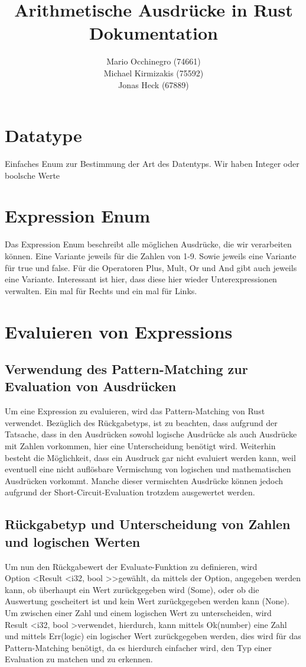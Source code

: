 \documentclass[a4paper, 1ppt]{article}
\title{Arithmetische Ausdrücke in Rust Dokumentation}
\date{}
\author{
		Mario Occhinegro (74661)\\
		Michael Kirmizakis (75592)\\
		Jonas Heck (67889)
}
\begin{document}
\nocite{*}
\maketitle
\newpage
\clearpage
\tableofcontents
\setcounter{page}{1}
\newpage
{}
\maketitle
\section{Datatype}
Einfaches Enum zur Bestimmung der Art des Datentyps.
Wir haben Integer oder boolsche Werte
\section{Expression Enum}
Das Expression Enum beschreibt alle möglichen Ausdrücke, die wir verarbeiten können.
Eine Variante jeweils für die Zahlen von 1-9. Sowie jeweils eine Variante für true und false.
Für die Operatoren Plus, Mult, Or und And gibt auch jeweils eine Variante. Interessant ist hier, dass 
diese hier wieder Unterexpressionen verwalten. Ein mal für Rechts und ein mal für Links.
\section{Evaluieren von Expressions}
\subsection{Verwendung des Pattern-Matching zur Evaluation von Ausdrücken}
Um eine Expression zu evaluieren, wird das Pattern-Matching von Rust verwendet. Bezüglich des Rückgabetyps, ist zu beachten, dass aufgrund der Tatsache, dass in den Ausdrücken sowohl logische Ausdrücke als auch Ausdrücke mit Zahlen vorkommen, hier eine Unterscheidung benötigt wird. Weiterhin besteht die Möglichkeit, dass ein Ausdruck gar nicht evaluiert werden kann, weil eventuell eine nicht auflösbare Vermischung von logischen und mathematischen Ausdrücken vorkommt. Manche dieser vermischten Ausdrücke können jedoch aufgrund der Short-Circuit-Evaluation trotzdem ausgewertet werden.
\subsection{Rückgabetyp und Unterscheidung von Zahlen und logischen Werten}
Um nun den Rückgabewert der Evaluate-Funktion zu definieren, wird \\Option \textless Result \textless i32, bool \textgreater  \textgreater  gewählt, da mittels der Option, angegeben werden kann, ob überhaupt ein Wert zurückgegeben wird (Some), oder ob die Auswertung gescheitert ist und kein Wert zurückgegeben werden kann (None). Um zwischen einer Zahl und einem logischen Wert zu unterscheiden, wird
\\Result \textless i32, bool \textgreater  verwendet, hierdurch, kann mittels Ok(number) eine Zahl und mittels Err(logic) ein logischer Wert zurückgegeben werden, dies wird für das Pattern-Matching benötigt, da es hierdurch einfacher wird, den Typ einer Evaluation zu matchen und zu erkennen.
\end{document}
